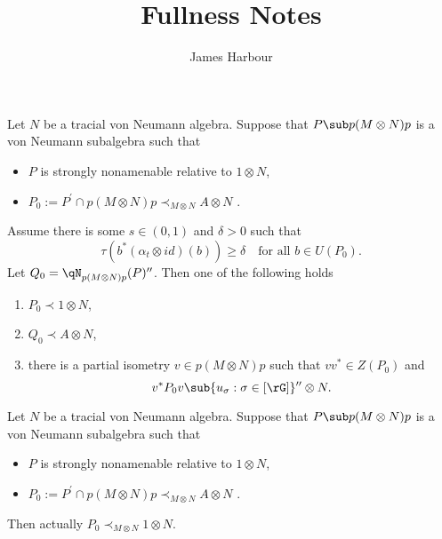 \documentclass[12pt]{article}
\title{Fullness Notes}
\author{James Harbour}
\begin{document}
\maketitle


\begin{lemma}
  Let $ N $ be a tracial von Neumann algebra. Suppose that $ P\sub p(M \otimes N) p $ is a von Neumann subalgebra such that 
  \begin{itemize}
    \item $ P $ is strongly nonamenable relative to $ 1 \otimes N $,
    \item $ P_{0}:= P^{\prime}\cap p(M \otimes N)p \prec_{M \otimes N} A \otimes  N$ .
  \end{itemize}
  Assume there is some $ s\in (0,1) $ and $ \delta>0 $ such that 
  \[
    \tau(b^{*}( \alpha_{t} \otimes id)(b)) \geq \delta \quad \text{for all }b\in U(P_{0}).
  \]
  Let $ Q_{0} = \qN_{p(M \otimes N)p}(P)^{\prime\prime} $. Then one of the following holds
  \begin{enumerate}
    \item $ P_{0} \prec 1\otimes N  $,
    \item $ Q_{0} \prec A \otimes N$,
    \item there is a partial isometry $ v\in p(M \otimes N) p $ such that $ vv^{*}\in Z(P_{0}) $ and 
      \[
        v^{*}P_{0} v \sub \{u_{\sigma}: \sigma\in [\rG]\}^{\prime\prime} \otimes N.
      \]
  \end{enumerate}

\end{lemma}


\begin{theorem}
  Let $ N $ be a tracial von Neumann algebra. Suppose that $ P\sub p(M \otimes N) p $ is a von Neumann subalgebra such that 
  \begin{itemize}
    \item $ P $ is strongly nonamenable relative to $ 1 \otimes N $,
    \item $ P_{0}:= P^{\prime}\cap p(M \otimes N)p \prec_{M \otimes N} A \otimes  N$ .
  \end{itemize}
  Then actually $ P_{0}\prec_{M \otimes N}  1 \otimes N  $.
\end{theorem}
\end{document}
